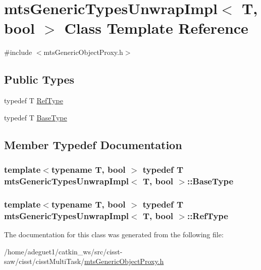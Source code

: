 \hypertarget{classmts_generic_types_unwrap_impl}{\section{mts\-Generic\-Types\-Unwrap\-Impl$<$ T, bool $>$ Class Template Reference}
\label{classmts_generic_types_unwrap_impl}
}


{\ttfamily \#include $<$mts\-Generic\-Object\-Proxy.\-h$>$}

\subsection*{Public Types}
\begin{DoxyCompactItemize}
\item 
typedef T \hyperlink{classmts_generic_types_unwrap_impl_aad54104577cad75bd20cfb9efd80346b}{Ref\-Type}
\item 
typedef T \hyperlink{classmts_generic_types_unwrap_impl_a1ea28a8dbb0198e7d104daa728056213}{Base\-Type}
\end{DoxyCompactItemize}


\subsection{Member Typedef Documentation}
\hypertarget{classmts_generic_types_unwrap_impl_a1ea28a8dbb0198e7d104daa728056213}{
\subsubsection[{Base\-Type}]{\setlength{\rightskip}{0pt plus 5cm}template$<$typename T, bool $>$ typedef T {\bf mts\-Generic\-Types\-Unwrap\-Impl}$<$ T, bool $>$\-::{\bf Base\-Type}}}\label{classmts_generic_types_unwrap_impl_a1ea28a8dbb0198e7d104daa728056213}
\hypertarget{classmts_generic_types_unwrap_impl_aad54104577cad75bd20cfb9efd80346b}{
\subsubsection[{Ref\-Type}]{\setlength{\rightskip}{0pt plus 5cm}template$<$typename T, bool $>$ typedef T {\bf mts\-Generic\-Types\-Unwrap\-Impl}$<$ T, bool $>$\-::{\bf Ref\-Type}}}\label{classmts_generic_types_unwrap_impl_aad54104577cad75bd20cfb9efd80346b}


The documentation for this class was generated from the following file\-:\begin{DoxyCompactItemize}
\item 
/home/adeguet1/catkin\-\_\-ws/src/cisst-\/saw/cisst/cisst\-Multi\-Task/\hyperlink{mts_generic_object_proxy_8h}{mts\-Generic\-Object\-Proxy.\-h}\end{DoxyCompactItemize}
